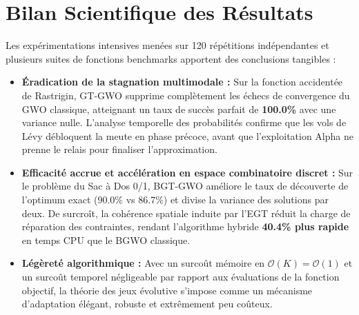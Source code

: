 \section{Bilan Scientifique des Résultats}
Les expérimentations intensives menées sur 120 répétitions indépendantes et plusieurs suites de fonctions benchmarks apportent des conclusions tangibles :
\begin{itemize}[label=\textbullet]
    \item \textbf{Éradication de la stagnation multimodale :} Sur la fonction accidentée de Rastrigin, GT-GWO supprime complètement les échecs de convergence du GWO classique, atteignant un taux de succès parfait de \textbf{100.0\%} avec une variance nulle. L'analyse temporelle des probabilités confirme que les vols de Lévy débloquent la meute en phase précoce, avant que l'exploitation Alpha ne prenne le relais pour finaliser l'approximation.
    \item \textbf{Efficacité accrue et accélération en espace combinatoire discret :} Sur le problème du Sac à Dos 0/1, BGT-GWO améliore le taux de découverte de l'optimum exact (90.0\% vs 86.7\%) et divise la variance des solutions par deux. De surcroît, la cohérence spatiale induite par l'EGT réduit la charge de réparation des contraintes, rendant l'algorithme hybride \textbf{40.4\% plus rapide} en temps CPU que le BGWO classique.
    \item \textbf{Légèreté algorithmique :} Avec un surcoût mémoire en $\mathcal{O}(K) = \mathcal{O}(1)$ et un surcoût temporel négligeable par rapport aux évaluations de la fonction objectif, la théorie des jeux évolutive s'impose comme un mécanisme d'adaptation élégant, robuste et extrêmement peu coûteux.
\end{itemize}

